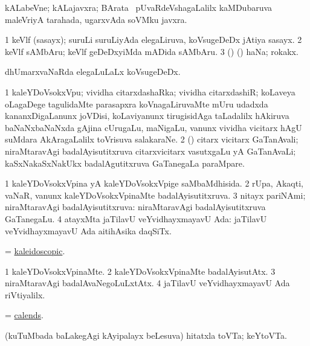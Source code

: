 \bentry
{}
\gl{\nA}
\bmng
kALabeVne; kALajavxra; BArata \mo\ pUvaRdeVshagaLalilx kaMDubaruva maleVriyA tarahada, ugarxvAda soVMku javxra. 
\emng
\eentry

\bentry
{}
\gl{\nA}
\bmng
\bnum
\num{1} keVlf (sasayx); suruLi suruLiyAda elegaLiruva, koVsugeDeDx jAtiya sasayx. 
\num{2} keVlf sAMbAru; keVlf geDeDxyiMda mADida sAMbAru. 
\num{3} (\ame) (\ashi) haNa; rokakx. 
\enum
\emng

\noindent
\gl{\pagu}
\bmng
{} dhUmarxvaNaRda elegaLuLaLx koVsugeDeDx. 
\emng
\eentry

\bentry
{}
\gl{\nA}
\bmng
\bnum
\num{1} kaleYDoVsokxVpu; vividha citarxdashaRka; vividha citarxdashiR; koLaveya oLagaDege tagulidaMte parasapxra  koVnagaLiruvaMte mUru udadxda kananxDigaLanunx joVDisi, koLaviyanunx tirugisidAga taLadalilx hAkiruva baNaNxbaNaNxda gAjina cUrugaLu, maNigaLu, \mo vanunx vividha vicitarx hAgU suMdara AkAragaLalilx toVrisuva salakaraNe. 
\num{2} (\rUpa) citarx vicitarx GaTanAvali; niraMtaravAgi badalAyisutitxruva citarxvicitarx vasutxgaLu yA GaTanAvaLi; kaSxNakaSxNakUkx badalAgutitxruva GaTanegaLa paraMpare. 
\enum
\emng
\eentry

\bentry
{}
\gl{\gu}
\bmng
\bnum
\num{1} kaleYDoVsokxVpina yA kaleYDoVsokxVpige saMbaMdhisida. 
\num{2} rUpa, Akaqti, vaNaR, \mo vanunx kaleYDoVsokxVpinaMte badalAyisutitxruva. 
\num{3} nitayx pariNAmi; niraMtaravAgi badalAyisutitxruva:  niraMtaravAgi badalAyisutitxruva GaTanegaLu. 
\num{4} atayxMta jaTilavU veYvidhayxmayavU Ada:  jaTilavU veYvidhayxmayavU Ada aitihAsika daqSiTx. 
\enum
\emng
\eentry

\bentry
{}
\gl{\gu}
\bmng
 = \hyperlink{kaleidoscopic}{kaleidoscopic}. 
\emng
\eentry

\bentry
{}
\gl{\kirxvi}
\bmng
\bnum
\num{1} kaleYDoVsokxVpinaMte. 
\num{2} kaleYDoVsokxVpinaMte badalAyisutAtx. 
\num{3} niraMtaravAgi badalAvaNegoLuLxtAtx. 
\num{4} jaTilavU veYvidhayxmayavU Ada riVtiyalilx. 
\enum
\emng
\eentry

\bentry
{}
\gl{\nA}
\bmng
= \hyperref{kandict_c.pdf}{C}{calends}{calends}. 
\emng
\eentry

\bentry
{}
\gl{\nA}
\bmng
(kuTuMbada baLakegAgi kAyipalayx beLesuva) hitatxla toVTa; keYtoVTa. 
\emng
\eentry

